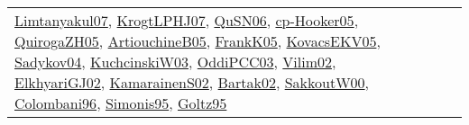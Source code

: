 {\begin{longtable}{lp{3cm}>{\raggedright}p{6cm}>{\raggedright}p{6cm}p{8cm}}
\href{papers/Limtanyakul07.pdf}{Limtanyakul07}\cite{Limtanyakul07}, \href{papers/KrogtLPHJ07.pdf}{KrogtLPHJ07}\cite{KrogtLPHJ07}, \href{papers/QuSN06.pdf}{QuSN06}\cite{QuSN06}, \href{papers/cp-Hooker05.pdf}{cp-Hooker05}\cite{cp-Hooker05}, \href{papers/QuirogaZH05.pdf}{QuirogaZH05}\cite{QuirogaZH05}, \href{papers/ArtiouchineB05.pdf}{ArtiouchineB05}\cite{ArtiouchineB05}, \href{papers/FrankK05.pdf}{FrankK05}\cite{FrankK05}, \href{papers/KovacsEKV05.pdf}{KovacsEKV05}\cite{KovacsEKV05}, \href{papers/Sadykov04.pdf}{Sadykov04}\cite{Sadykov04}, \href{articles/KuchcinskiW03.pdf}{KuchcinskiW03}\cite{KuchcinskiW03}, \href{papers/OddiPCC03.pdf}{OddiPCC03}\cite{OddiPCC03}, \href{papers/Vilim02.pdf}{Vilim02}\cite{Vilim02}, \href{papers/ElkhyariGJ02.pdf}{ElkhyariGJ02}\cite{ElkhyariGJ02}, \href{papers/KamarainenS02.pdf}{KamarainenS02}\cite{KamarainenS02}, \href{papers/Bartak02.pdf}{Bartak02}\cite{Bartak02}, \href{articles/SakkoutW00.pdf}{SakkoutW00}\cite{SakkoutW00}, \href{papers/Colombani96.pdf}{Colombani96}\cite{Colombani96}, \href{papers/Simonis95.pdf}{Simonis95}\cite{Simonis95}, \href{papers/Goltz95.pdf}{Goltz95}\cite{Goltz95}\\

\end{longtable}}
